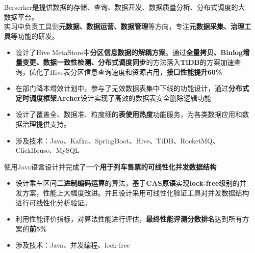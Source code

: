 \documentclass{resume}
\begin{document}
  Berserker是提供数据的存储、查询、数据开发、数据质量分析、分布式调度的大数据平台。\\
  实习中负责工具侧\textbf{元数据、数据运营、数据管理}等方向，专注\textbf{元数据采集、治理工具}等功能的研发。
  \begin{itemize}
    \item 设计了Hive MetaStore中\textbf{分区信息数据的解耦方案}。通过\textbf{全量拷贝、Binlog增量变更、数据一致性检测、分布式调度同步}的方法落入\textbf{TiDB}的方案加速查询，优化了Hive表分区信息查询速度和资源占用，\textbf{接口性能提升60\%}
    \item 在部门降本增效计划中，参与了无效数据表集中下线的功能设计，通过\textbf{分布式定时调度框架Archer}设计实现了高效的数据表安全删除逻辑功能
    \item 设计了覆盖全、数据准、粒度细的\textbf{表使用热度}功能服务，为各类数据应用和数据治理提供支持。
    \item 涉及技术：Java、Kafka、SpringBoot、Hive、TiDB、RocketMQ、ClickHouse、MySQL
  \end{itemize}
  
  \begin{onehalfspacing}
    使用Java语言设计并完成了一个\textbf{用于列车售票的可线性化并发数据结构}
  \begin{itemize}
    \item 设计乘车区间\textbf{二进制编码运算}的算法，基于\textbf{CAS原语}实现\textbf{lock-free}级别的并发方案，性能上大幅度改进。并且设计采用可线性化验证工具对并发数据结构进行可线性化分析验证。
    \item 利用性能评价指标，对算法性能进行评估，\textbf{最终性能评测分数排名}达到所有方案的\textbf{前5\%}
    \item 涉及技术：Java、并发编程、lock-free
  \end{itemize}
  \end{onehalfspacing}

\end{document}
